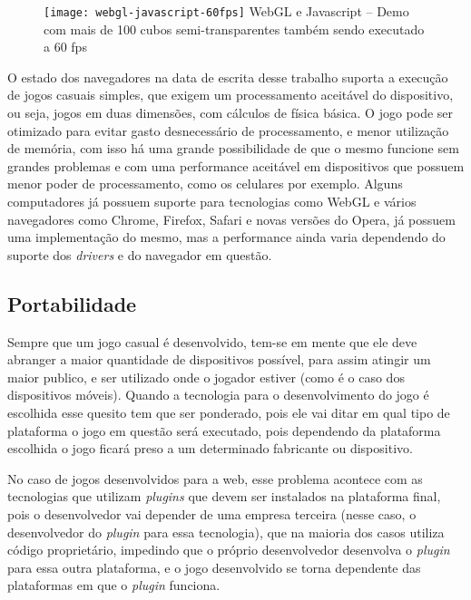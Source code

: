 \begin{figure}[H]
  \centering
	\texttt{[image: webgl-javascript-60fps]}
	\footnotesize\hspace{8\baselineskip}
	WebGL e Javascript {--} Demo com mais de 100 cubos semi-transparentes também sendo executado a 60 fps
  \label{img:webgl-javascript-60fps}
\end{figure}

O estado dos navegadores na data de escrita desse
trabalho suporta a execução de jogos casuais simples, que exigem
um processamento aceitável do dispositivo, ou seja, jogos em duas
dimensões, com cálculos de física básica. O jogo pode ser otimizado
para evitar gasto desnecessário de processamento, e menor utilização
de memória, com isso há uma grande possibilidade de que o mesmo
funcione sem grandes problemas e com uma performance aceitável em dispositivos
que possuem menor poder de processamento, como os celulares por exemplo.
Alguns computadores já possuem suporte para tecnologias como WebGL e
vários navegadores como Chrome, Firefox, Safari e novas versões do
Opera, já possuem uma implementação do mesmo, mas a performance ainda
varia dependendo do suporte dos \textit{drivers} e do navegador em
questão.

\subsection{Portabilidade}

Sempre que um jogo casual é desenvolvido, tem-se em mente que ele deve
abranger a maior quantidade de dispositivos possível, para assim
atingir um maior publico, e ser utilizado onde o jogador estiver (como
é o caso dos dispositivos móveis). Quando a tecnologia para o
desenvolvimento do jogo é escolhida esse quesito tem que ser
ponderado, pois ele vai ditar em qual tipo de plataforma o jogo em
questão será executado, pois dependendo da plataforma escolhida o jogo ficará preso
a um determinado fabricante ou dispositivo.

No caso de jogos desenvolvidos para a web, esse problema acontece com as
tecnologias que utilizam \textit{plugins} que devem ser instalados na
plataforma final, pois o desenvolvedor vai depender de uma empresa
terceira (nesse caso, o desenvolvedor do \textit{plugin} para essa tecnologia),
que na maioria dos casos utiliza código proprietário, impedindo que o
próprio desenvolvedor desenvolva o \textit{plugin} para essa outra plataforma,
e o jogo desenvolvido se torna dependente das plataformas em que o
\textit{plugin}
funciona.

